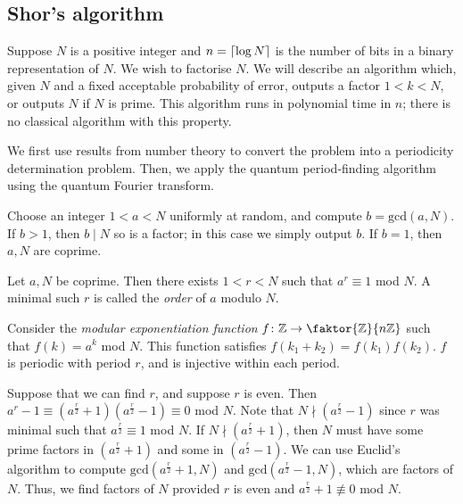 \subsection{Shor's algorithm}
Suppose \( N \) is a positive integer and \( n = \lceil\log N\rceil \) is the number of bits in a binary representation of \( N \).
We wish to factorise \( N \).
We will describe an algorithm which, given \( N \) and a fixed acceptable probability of error, outputs a factor \( 1 < k < N \), or outputs \( N \) if \( N \) is prime.
This algorithm runs in polynomial time in \( n \); there is no classical algorithm with this property.

We first use results from number theory to convert the problem into a periodicity determination problem.
Then, we apply the quantum period-finding algorithm using the quantum Fourier transform.

Choose an integer \( 1 < a < N \) uniformly at random, and compute \( b = \mathrm{gcd}(a,N) \).
If \( b > 1 \), then \( b \mid N \) so is a factor; in this case we simply output \( b \).
If \( b = 1 \), then \( a, N \) are coprime.
\begin{theorem}
    Let \( a, N \) be coprime.
    Then there exists \( 1 < r < N \) such that \( a^r \equiv 1 \) mod \( N \).
    A minimal such \( r \) is called the \emph{order} of \( a \) modulo \( N \).
\end{theorem}
Consider the \emph{modular exponentiation function} \( f \colon \mathbb Z \to \faktor{\mathbb Z}{n\mathbb Z} \) such that \( f(k) = a^k \) mod \( N \).
This function satisfies \( f(k_1 + k_2) = f(k_1)f(k_2) \).
\( f \) is periodic with period \( r \), and is injective within each period.

Suppose that we can find \( r \), and suppose \( r \) is even.
Then \( a^r - 1 \equiv (a^{\frac{r}{2}}+1)(a^{\frac{r}{2}}-1) \equiv 0 \) mod \( N \).
Note that \( N \nmid (a^{\frac{r}{2}}-1) \) since \( r \) was minimal such that \( a^{\frac{r}{2}} \equiv 1 \) mod \( N \).
If \( N \nmid (a^{\frac{r}{2}}+1) \), then \( N \) must have some prime factors in \( (a^{\frac{r}{2}}+1) \) and some in \( (a^{\frac{r}{2}}-1) \).
We can use Euclid's algorithm to compute \( \mathrm{gcd}(a^{\frac{r}{2}}+1, N) \) and \( \mathrm{gcd}(a^{\frac{r}{2}}-1, N) \), which are factors of \( N \).
Thus, we find factors of \( N \) provided \( r \) is even and \( a^{\frac{r}{2}} + 1 \not\equiv 0 \) mod \( N \).

